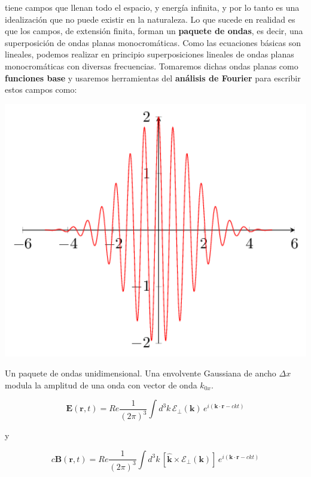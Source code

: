  tiene campos que llenan todo el espacio, y energía infinita, y por lo tanto es una idealización que no puede existir en la naturaleza. Lo que sucede en realidad es que los campos, de extensión finita, forman un \textbf{paquete de ondas}, es decir, una superposición de ondas planas monocromáticas. Como las ecuaciones básicas son lineales, podemos realizar en principio superposiciones lineales de ondas planas monocromáticas con diversas frecuencias\cite[][p.323]{Jackson}. Tomaremos dichas ondas planas como \textbf{funciones base} y usaremos herramientas del \textbf{análisis de Fourier} para escribir estos campos como:
\begin{marginfigure}
\captionsetup{type=figure}
    \centering
    \includegraphics[width=1.3\textwidth]{Im/eoUPl.png}
    \caption{Un paquete de ondas unidimensional. Una envolvente Gaussiana de ancho $\Delta x$ modula la amplitud de una onda con vector de onda $k_{0x}$.}
    \label{fig:paquete}
\end{marginfigure}
\begin{equation}
    \mathbf{E}(\mathbf{r},t)=Re\frac{1}{(2\pi)^3}\int d^3k \, \boldsymbol{\mathcal{E}}_{\perp}(\mathbf{k})\, e^{i(\mathbf{k}\cdot \mathbf{r}-ckt)}
\end{equation}

y

\begin{equation}
    c\mathbf{B}(\mathbf{r},t)=Re\frac{1}{(2\pi)^3}\int d^3k \, \left[\boldsymbol{\hat{\mathbf{k}}\times \mathcal{E}}_{\perp}(\mathbf{k})\right]\, e^{i(\mathbf{k}\cdot \mathbf{r}-ckt)}
\end{equation}
 
